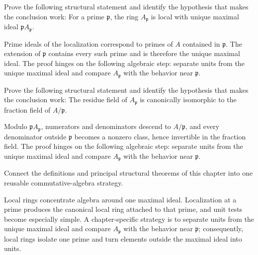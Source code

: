 \begin{problem}\label{prob:v08-problem-10}
Prove the following structural statement and identify the hypothesis that makes the conclusion work: For a prime $\mathfrak p$, the ring $A_{\mathfrak p}$ is local with unique maximal ideal $\mathfrak p A_{\mathfrak p}$.
\end{problem}
\begin{solution}
Prime ideals of the localization correspond to primes of $A$ contained in $\mathfrak p$. The extension of $\mathfrak p$ contains every such prime and is therefore the unique maximal ideal. The proof hinges on the following algebraic step: separate units from the unique maximal ideal and compare \(A_{\mathfrak p}\) with the behavior near \(\mathfrak p\).
\end{solution}

\begin{problem}\label{prob:v08-problem-11}
Prove the following structural statement and identify the hypothesis that makes the conclusion work: The residue field of $A_{\mathfrak p}$ is canonically isomorphic to the fraction field of $A/\mathfrak p$.
\end{problem}
\begin{solution}
Modulo $\mathfrak p A_{\mathfrak p}$, numerators and denominators descend to $A/\mathfrak p$, and every denominator outside $\mathfrak p$ becomes a nonzero class, hence invertible in the fraction field. The proof hinges on the following algebraic step: separate units from the unique maximal ideal and compare \(A_{\mathfrak p}\) with the behavior near \(\mathfrak p\).
\end{solution}

\begin{problem}\label{prob:v08-problem-12}
Connect the definitions and principal structural theorems of this chapter into one reusable commutative-algebra strategy.
\end{problem}
\begin{solution}
Local rings concentrate algebra around one maximal ideal. Localization at a prime produces the canonical local ring attached to that prime, and unit tests become especially simple. A chapter-specific strategy is to separate units from the unique maximal ideal and compare \(A_{\mathfrak p}\) with the behavior near \(\mathfrak p\); consequently, local rings isolate one prime and turn elements outside the maximal ideal into units.
\end{solution}

